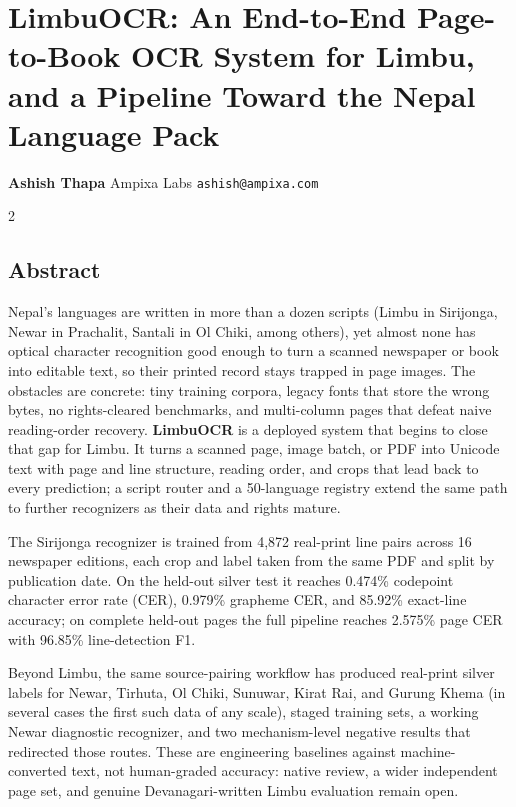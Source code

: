 \documentclass[
  10pt,
]{article}
\author{}
\date{}
\begin{document}
\section{LimbuOCR: An End-to-End Page-to-Book OCR System for Limbu, and
a Pipeline Toward the Nepal Language
Pack}\label{limbuocr-an-end-to-end-page-to-book-ocr-system-for-limbu-and-a-pipeline-toward-the-nepal-language-pack}

\textbf{Ashish Thapa} Ampixa Labs \texttt{ashish@ampixa.com}

\begin{multicols}{2}

\subsection{Abstract}\label{abstract}

Nepal's languages are written in more than a dozen scripts (Limbu in
Sirijonga, Newar in Prachalit, Santali in Ol Chiki, among others), yet
almost none has optical character recognition good enough to turn a
scanned newspaper or book into editable text, so their printed record
stays trapped in page images. The obstacles are concrete: tiny training
corpora, legacy fonts that store the wrong bytes, no rights-cleared
benchmarks, and multi-column pages that defeat naive reading-order
recovery. \textbf{LimbuOCR} is a deployed system that begins to close
that gap for Limbu. It turns a scanned page, image batch, or PDF into
Unicode text with page and line structure, reading order, and crops that
lead back to every prediction; a script router and a 50-language
registry extend the same path to further recognizers as their data and
rights mature.

The Sirijonga recognizer is trained from 4,872 real-print line pairs
across 16 newspaper editions, each crop and label taken from the same
PDF and split by publication date. On the held-out silver test it
reaches 0.474\% codepoint character error rate (CER), 0.979\% grapheme
CER, and 85.92\% exact-line accuracy; on complete held-out pages the
full pipeline reaches 2.575\% page CER with 96.85\% line-detection F1.

Beyond Limbu, the same source-pairing workflow has produced real-print
silver labels for Newar, Tirhuta, Ol Chiki, Sunuwar, Kirat Rai, and
Gurung Khema (in several cases the first such data of any scale), staged
training sets, a working Newar diagnostic recognizer, and two
mechanism-level negative results that redirected those routes. These are
engineering baselines against machine-converted text, not human-graded
accuracy: native review, a wider independent page set, and genuine
Devanagari-written Limbu evaluation remain open.


\end{multicols}
\end{document}
